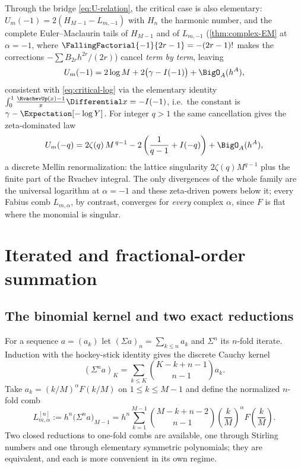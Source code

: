 \begin{remark}
Through the bridge \eqref{eq:U-relation}, the critical case is also
elementary: $U_m(-1)=2(H_{M-1}-L_{m,-1})$ with $H_n$ the harmonic
number, and the complete Euler--Maclaurin tails of $H_{M-1}$ and of
$L_{m,-1}$ (\cref{thm:complex-EM} at $\alpha=-1$, where
$\FallingFactorial{-1}{2r-1}=-(2r-1)!$ makes the corrections
$-\sum B_{2r}h^{2r}/(2r)$) cancel \emph{term by term}, leaving
\begin{equation}
 U_m(-1)=2\log M+2\bigl(\gamma-I(-1)\bigr)+\BigO_A(h^{A}),
 \label{eq:critical-log-F}
\end{equation}
consistent with \eqref{eq:critical-log} via the elementary identity
$\int_0^1\frac{\RvachevUp(x)-1}{x}\Differential x=-I(-1)$, i.e.\ the constant is
$\gamma-\Expectation[-\log Y]$.  For integer $q>1$ the same cancellation gives
the zeta-dominated law
\begin{equation}
 U_m(-q)
 =2\zeta(q)\,M^{\,q-1}
 -2\left(\frac{1}{q-1}+I(-q)\right)
 +\BigO_A(h^{A}),
 \label{eq:U-q}
\end{equation}
a discrete Mellin renormalization: the lattice singularity
$2\zeta(q)M^{q-1}$ plus the finite part of the Rvachev integral.  The
only divergences of the whole family are the universal logarithm at
$\alpha=-1$ and these zeta-driven powers below it; every Fabius comb
$L_{m,\alpha}$, by contrast, converges for \emph{every} complex
$\alpha$, since $F$ is flat where the monomial is singular.
\end{remark}

\section{Iterated and fractional-order summation}
\label{sec:iterated}

\subsection{The binomial kernel and two exact reductions}

For a sequence $a=(a_k)$ let $(\Sigma a)_n=\sum_{k\le n}a_k$ and
$\Sigma^{n}$ its $n$-fold iterate.  Induction with the hockey-stick
identity gives the discrete Cauchy kernel
\begin{equation}
 (\Sigma^{n}a)_{K}
 =\sum_{k\le K}\binom{K-k+n-1}{n-1}a_k.
 \label{eq:prefix-kernel}
\end{equation}
Take $a_k=(k/M)^{\alpha}F(k/M)$ on $1\le k\le M-1$ and define the
normalized $n$-fold comb
\begin{equation}
 L^{[n]}_{m,\alpha}
 :=h^{n}\bigl(\Sigma^{n}a\bigr)_{M-1}
 =h^{n}\sum_{k=1}^{M-1}\binom{M-k+n-2}{n-1}
 \left(\frac kM\right)^{\alpha}F\!\left(\frac kM\right).
 \label{eq:iter-def}
\end{equation}
Two closed reductions to one-fold combs are available, one through
Stirling numbers and one through elementary symmetric polynomials;
they are equivalent, and each is more convenient in its own regime.

